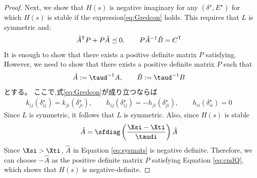 \documentclass[graybox, envcountchap]{svmult}
\begin{document}
\begin{proof}
Next, we show that $H(s)$ is negative imaginary for any $(\delta^{\star},E^{\star})$ for which $H(s)$ is stable if the expression\ref{eq:Gredcon} holds.
This requires that $L$ is symmetric and:
\begin{align}\label{eq:cndQ}
\tilde{A}^{\sf T}P + P\tilde{A} \preceq 0
,\qquad
P\tilde{A}^{-1}\tilde{B}=C^{\sf T}
\end{align}
It is enough to show that there exists a positive definite matrix $P$ satisfying.
However, we need to show that there exists a positive definite matrix $P$ such that
\begin{align*}
\tilde{A}:= \taud^{-1}A
,\qquad
\tilde{B}:= \taud^{-1}B
\end{align*}
とする。
ここで,式\ref{eq:Gredcon}が成り立つならば
\begin{align*}
k_{ij}(\delta_{ij}^{\star}) =
k_{ji}(\delta_{ji}^{\star})
,\qquad
h_{ij}(\delta_{ij}^{\star}) = 
- h_{ji}(\delta_{ji}^{\star}),\qquad
h_{ii}(\delta_{ii}^{\star}) = 0
\end{align*}
Since $L$ is symmetric, it follows that $L$ is symmetric.
Also, since $H(s)$ is stable
\begin{align*}
\tilde{A} = 
\sfdiag \left( \frac{ \Xsi -  \Xti }{ \taudi } \right)
\hat{A}
\end{align*}
Since $\Xsi > \Xti$, $\hat{A}$ in Equation \ref{eq:sysmats} is negative definite.
Therefore, we can choose $-\hat{A}$ as the positive definite matrix $P$ satisfying Equation \ref{eq:cndQ}, which shows that $H(s)$ is negative-definite.



\end{proof}
\end{document}
